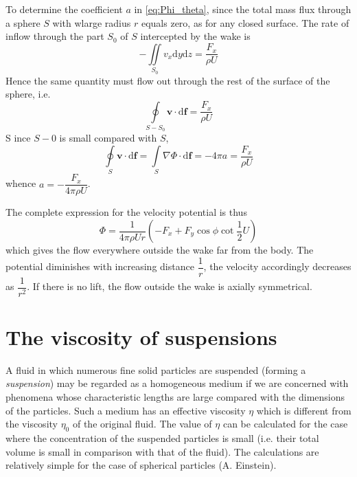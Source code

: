 \documentclass[conference]{IEEEtran}
\theoremstyle{definition}
\theoremstyle{remark}
\begin{document}
    To determine the coefficient $a$ in \ref{eq:Phi_theta}, since the total mass flux through a sphere $S$ with wlarge radius $r$ equals zero, as for any closed surface. The rate of inflow through the part $S_0$ of $S$ intercepted by the wake is
    \begin{equation*}
        -\iint\limits_{S_0} v_x \mathrm{d} y \mathrm{d} z = \dfrac{F_x}{\rho U}
    \end{equation*}
    Hence the same quantity must flow out through the rest of the surface of the sphere, i.e.
    \begin{equation*}
        \oint\limits_{S - S_0} \mathbf{v} \cdot \mathrm{d} \mathbf{f} = \dfrac{F_x}{\rho U}
    \end{equation*}S
    ince $S-0$ is small compared with $S$,
    \begin{equation*}
        \oint\limits_{S} \mathbf{v} \cdot \mathrm{d} \mathbf{f} = \int\limits_S \nabla \Phi \cdot \mathrm{d} \mathbf{f} = -4\pi a = \dfrac{F_x}{\rho U}
    \end{equation*}
    whence $a = -\dfrac{F_x}{4 \pi \rho U}$.

    The complete expression for the velocity potential is thus
    \begin{equation*}
        \Phi = \dfrac1{4\pi \rho U r}(-F_x + F_y \cos \phi \cot \dfrac12 U)
    \end{equation*}
    which gives the flow everywhere outside the wake far from the body. The potential diminishes with increasing distance $\dfrac1r$, the velocity accordingly decreases as $\dfrac1{r^2}$. If there is no lift, the flow outside the wake is axially symmetrical.

    \section{The viscosity of suspensions}
    A fluid in which numerous fine solid particles are suspended (forming a \emph{suspension}) may be regarded as a homogeneous medium if we are concerned with phenomena whose characteristic lengths are large compared with the dimensions of the particles. Such a medium has an effective viscosity $\eta$ which is different from the viscosity $\eta_0$ of the original fluid. The value of $\eta$ can be calculated for the case where the concentration of the suspended particles is small (i.e. their total volume is small in comparison with that of the fluid). The calculations are relatively simple for the case of spherical particles (A. Einstein).
\end{document}
